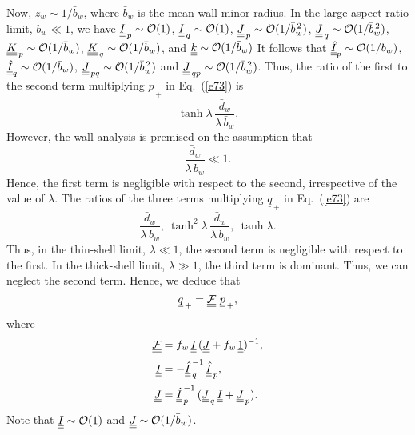 \documentclass[12pt,prb,aps,notitlepage]{revtex4-1}
\begin{document}
Now, $z_w\sim 1/\bar{b}_w$, where $\bar{b}_w$ is the mean wall minor radius. 
In the large aspect-ratio limit, $b_w\ll 1$, we have $\underline{\underline{I}}_{\,p}\sim{\cal O}(1)$, $\underline{\underline{I}}_{\,q}\sim{\cal O}(1)$, 
$\underline{\underline{J}}_{\,p}\sim{\cal O}(1/\bar{b}_w^{\,2})$, $\underline{\underline{J}}_{\,q}\sim{\cal O}(1/\bar{b}_w^{\,2})$, 
$\underline{\underline{K}}_{\,p}\sim{\cal O}(1/\bar{b}_w)$, $\underline{\underline{K}}_{\,q}\sim{\cal O}(1/\bar{b}_w)$,
and $\underline{\underline{k}}\sim{ \cal O}(1/\bar{b}_w)$  It follows that
$\underline{\underline{\hat I}}_p\sim{\cal O}(1/\bar{b}_w)$, $\underline{\underline{\hat I}}_q\sim{\cal O}(1/\bar{b}_w)$, $\underline{\underline{J}}_{\,pq} \sim{\cal O}(1/\bar{b}_w^{\,2})$ and $\underline{\underline{J}}_{\,qp} \sim{\cal O}(1/\bar{b}_w^{\,2})$. 
Thus, the ratio of the first to the second term multiplying $\underline{p}_{\,+}$ in Eq.~(\ref{e73}) is 
\begin{equation}
\tanh\lambda \,\frac{\bar{d}_w}{\lambda\,\bar{b}_w}.
\end{equation}
However, the wall analysis is premised on the assumption that
\begin{equation}
\frac{\bar{d}_w}{\lambda\,\bar{b}_w}\ll 1.
\end{equation}
Hence, the first term is negligible with respect to the second, irrespective of the value of $\lambda$. The
ratios of the three terms multiplying $\underline{q}_{\,+}$ in Eq.~(\ref{e73}) are
\begin{equation}
\frac{\bar{d}_w}{\lambda\,\bar{b}_w},~ \tanh^2\lambda\,\frac{\bar{d}_w}{\lambda\,\bar{b}_w},~ \tanh\lambda.
\end{equation}
Thus, in the thin-shell limit, $\lambda\ll 1$, the second term is negligible with respect to the first. In the thick-shell limit, $\lambda\gg 1$, the third term is
dominant. Thus, we can neglect the second term. Hence, we deduce that
\begin{equation}\label{e88}
\underline{q}_{\,+} = \underline{\underline{\cal F}}\,\,\underline{p}_{\,+},
\end{equation}
where
\begin{align}
\underline{\underline{\cal F}}&= 
f_w\,\underline{\underline{I}}\,(\underline{\underline{J}}+ f_w\,\underline{\underline{1}})^{-1},\\[0.5ex]
\underline{\underline{I}}&=  -\underline{\underline{\hat{I}}}_{\,q}^{\,-1}\,\underline{\underline{\hat{I}}}_{\,p},\\[0.5ex]
\underline{\underline{J}}&= \underline{\underline{\hat{I}}}_{\,p}^{\,-1}\,(\underline{\underline{J}}_{\,q}\,\underline{\underline{I}} + \underline{\underline{J}}_{\,p}).
\end{align}
Note that $\underline{\underline{I}}\sim {\cal O}(1)$  and $\underline{\underline{J}}\sim {\cal O}(1/\bar{b}_w)$. 
\end{document}
